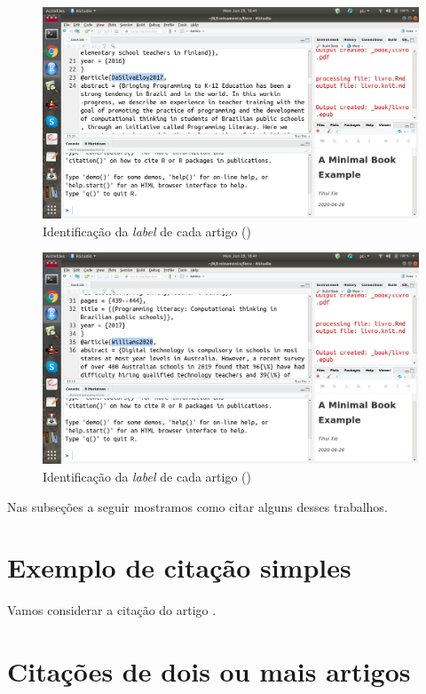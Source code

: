 \documentclass[]{book}
\begin{document}
\begin{figure}
\centering
\includegraphics{fig/rstudio_open_bookbib_second.png}
\caption{Identificação da \emph{label} de cada artigo
(\citep{DaSilvaEloy2017})}
\end{figure}

\begin{figure}
\centering
\includegraphics{fig/rstudio_open_bookbib_third.png}
\caption{Identificação da \emph{label} de cada artigo
(\citep{Williams2020})}
\end{figure}

Nas subseções a seguir mostramos como citar alguns desses trabalhos.

\section{Exemplo de citação
simples}\label{exemplo-de-citauxe7uxe3o-simples}

Vamos considerar a citação do artigo \citep{Partanen2016}.

\section{Citações de dois ou mais
artigos}\label{citauxe7uxf5es-de-dois-ou-mais-artigos}
\end{document}
